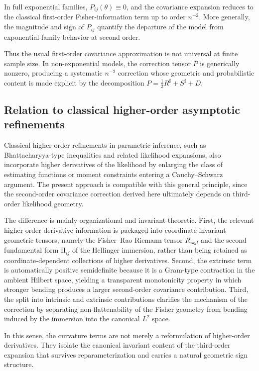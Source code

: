 \documentclass[11pt,letterpaper]{amsart}
\numberwithin{equation}{section}
\theoremstyle{plain}
\theoremstyle{definition}
\theoremstyle{remark}
\begin{document}
In full exponential families, \(P_{ij}(\theta)\equiv 0\), and the covariance expansion reduces to the classical first-order Fisher-information term up to order \(n^{-2}\). More generally, the magnitude and sign of \(P_{ij}\) quantify the departure of the model from exponential-family behavior at second order.

Thus the usual first-order covariance approximation is not universal at finite sample size. In non-exponential models, the correction tensor \(P\) is generically nonzero, producing a systematic \(n^{-2}\) correction whose geometric and probabilistic content is made explicit by the decomposition \(P=\frac12 R^\sharp+S^\sharp+D\).

\subsection{Relation to classical higher-order asymptotic refinements}

Classical higher-order refinements in parametric inference, such as Bhattacharyya-type inequalities and related likelihood expansions, also incorporate higher derivatives of the likelihood by enlarging the class of estimating functions or moment constraints entering a Cauchy--Schwarz argument. The present approach is compatible with this general principle, since the second-order covariance correction derived here ultimately depends on third-order likelihood geometry.

The difference is mainly organizational and invariant-theoretic. First, the relevant higher-order derivative information is packaged into coordinate-invariant geometric tensors, namely the Fisher--Rao Riemann tensor \(R_{ikjl}\) and the second fundamental form \(\mathrm{II}_{ij}\) of the Hellinger immersion, rather than being retained as coordinate-dependent collections of higher derivatives. Second, the extrinsic term is automatically positive semidefinite because it is a Gram-type contraction in the ambient Hilbert space, yielding a transparent monotonicity property in which stronger bending produces a larger second-order covariance contribution. Third, the split into intrinsic and extrinsic contributions clarifies the mechanism of the correction by separating non-flattenability of the Fisher geometry from bending induced by the immersion into the canonical \(L^2\) space.

In this sense, the curvature terms are not merely a reformulation of higher-order derivatives. They isolate the canonical invariant content of the third-order expansion that survives reparameterization and carries a natural geometric sign structure.
\end{document}

